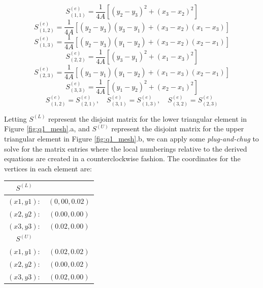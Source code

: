 \documentclass[11pt]{amsart}
\begin{document}
\begin{equation}
	\label{eq:q1_local_s11}
	S^{(e)}_{(1,1)} = \frac{1}{4A}[(y_2-y_3)^2 + (x_3 - x_2)^2]
\end{equation}
\begin{equation}
	\label{eq:q1_local_s12}
	S^{(e)}_{(1,2)} = \frac{1}{4A}[(y_2-y_3)(y_3 - y_1) + (x_3 - x_2)(x_1 - x_3)]
\end{equation}
\begin{equation}
	\label{eq:q1_local_s13}
	S^{(e)}_{(1,3)} = \frac{1}{4A}[(y_2-y_3)(y_1 - y_2) + (x_3 - x_2)(x_2 - x_1)]
\end{equation}
\begin{equation}
	\label{eq:q1_local_s22}
	S^{(e)}_{(2,2)} = \frac{1}{4A}[(y_3 - y_1)^2 + (x_1 - x_3)^2]
\end{equation}
\begin{equation}
	\label{eq:q1_local_s23}
	S^{(e)}_{(2,3)} = \frac{1}{4A}[(y_3 - y_1)(y_1 - y_2) + (x_1 - x_3)(x_2 - x_1)]
\end{equation}
\begin{equation}
	\label{eq:q1_local_s33}
	S^{(e)}_{(3,3)} = \frac{1}{4A}[(y_1 - y_2)^2 + (x_2 - x_1)^2]
\end{equation}
\begin{equation}
	\label{eq:q1_local_s_symmetry}
	S^{(e)}_{(1,2)} = S^{(e)}_{(2,1)}, \quad S^{(e)}_{(3,1)} = S^{(e)}_{(1,3)}, \quad S^{(e)}_{(3,2)} = S^{(e)}_{(2,3)}
\end{equation}

Letting $S^{(L)}$ represent the disjoint matrix for the lower triangular element in Figure \ref{fig:q1_mesh}.a, and $S^{(U)}$ represent the disjoint matrix for the upper triangular element in Figure \ref{fig:q1_mesh}.b, we can apply some \textit{plug-and-chug} to solve for the matrix entries where the local numberings relative to the derived equations are created in a counterclockwise fashion. The coordinates for the vertices in each element are:\\

\begin{center}
    \begin{tabular}{ c c } 
    $S^{(L)}$ & \\
    \hline
     $(x1,y1):$ & $(0,00, 0.02)$ \\ 
     $(x2,y2):$ & $(0.00, 0.00)$ \\ 
     $(x3,y3):$ & $(0.02, 0.00)$ \\[0.2in]
     $S^{(U)}$ & \\
     \hline
     $(x1,y1):$ & $(0.02, 0.02)$ \\ 
     $(x2,y2):$ & $(0.00, 0.02)$ \\ 
     $(x3,y3):$ & $(0.02, 0.00)$ \\ 

\end{tabular}
\end{center}
\end{document}
